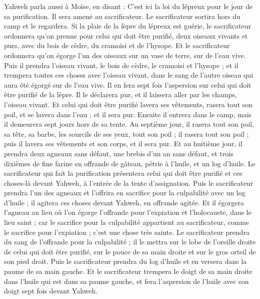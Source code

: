\begin{multicols}{2}
\VerseOne{}Yahweh parla aussi à Moïse, en disant :
C'est ici la loi du lépreux pour le jour de sa purification. Il sera amené au sacrificateur.
Le sacrificateur sortira hors du camp et le regardera. Si la plaie de la lèpre du lépreux est guérie,
le sacrificateur ordonnera qu'on prenne pour celui qui doit être purifié, deux oiseaux vivants et purs, avec du bois de cèdre, du cramoisi et de l'hysope.
Et le sacrificateur ordonnera qu'on égorge l'un des oiseaux sur un vase de terre, sur de l'eau vive.
Puis il prendra l'oiseau vivant, le bois de cèdre, le cramoisi et l'hysope ; et il trempera toutes ces choses avec l'oiseau vivant, dans le sang de l'autre oiseau qui aura été égorgé sur de l'eau vive.
Il en fera sept fois l'aspersion sur celui qui doit être purifié de la lèpre. Il le déclarera pur, et il laissera aller par les champs, l'oiseau vivant.
Et celui qui doit être purifié lavera ses vêtements, rasera tout son poil, et se lavera dans l'eau ; et il sera pur. Ensuite il entrera dans le camp, mais il demeurera sept jours hors de sa tente.
Au septième jour, il rasera tout son poil, sa tête, sa barbe, les sourcils de ses yeux, tout son poil ; il rasera tout son poil ; puis il lavera ses vêtements et son corps, et il sera pur.
Et au huitième jour, il prendra deux agneaux sans défaut, une brebis d'un an sans défaut, et trois dixièmes de fine farine en offrande de gâteau, pétrie à l'huile, et un log d'huile.
Le sacrificateur qui fait la purification présentera celui qui doit être purifié et ces choses-là devant Yahweh, à l'entrée de la tente d'assignation.
Puis le sacrificateur prendra l'un des agneaux et l'offrira en sacrifice pour la culpabilité avec un log d'huile ; il agitera ces choses devant Yahweh, en offrande agitée.
Et il égorgera l'agneau au lieu où l'on égorge l'offrande pour l'expiation et l'holocauste, dans le lieu saint ; car le sacrifice pour la culpabilité appartient au sacrificateur, comme le sacrifice pour l'expiation ; c'est une chose très sainte.
Le sacrificateur prendra du sang de l'offrande pour la culpabilité ; il le mettra sur le lobe de l'oreille droite de celui qui doit être purifié, sur le pouce de sa main droite et sur le gros orteil de son pied droit.
Puis le sacrificateur prendra du log d'huile et en versera dans la paume de sa main gauche.
Et le sacrificateur trempera le doigt de sa main droite dans l'huile qui est dans sa paume gauche, et fera l'aspersion de l'huile avec son doigt sept fois devant Yahweh.

\end{multicols}
